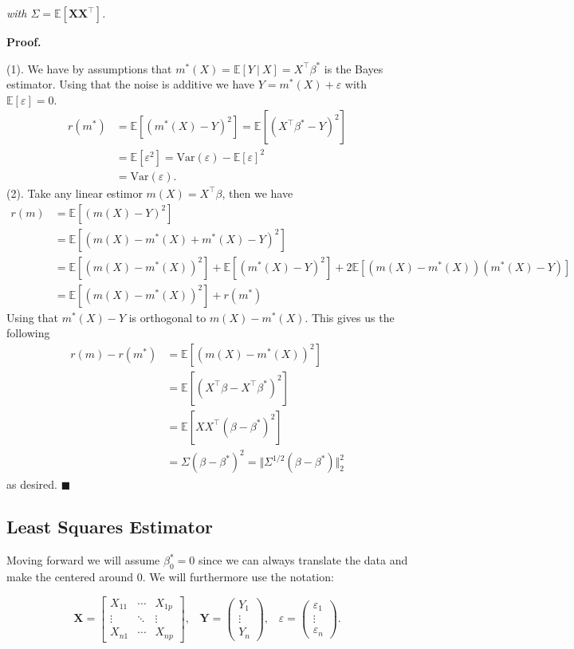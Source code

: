 \documentclass[a4paper,10pt,openany]{book}
\begin{document}
\emph{with \(\Sigma = \mathbb E[\mathbf X\mathbf X^\top]\).}

\textbf{Proof.}

(1). We have by assumptions that \(m^*(X)=\mathbb E[Y\ \vert\ X]=X^\top\beta^*\) is the Bayes estimator. Using that the noise is additive we have \(Y=m^*(X)+\varepsilon\) with \(\mathbb E[\varepsilon]=0\).
\begin{align*}
r(m^*)&=\mathbb E[(m^*(X)-Y)^2]=\mathbb E[(X^\top\beta ^*-Y)^2]\\
&=\mathbb E[\varepsilon^2]=\text{Var}(\varepsilon)-\mathbb E[\varepsilon]^2\\
&=\text{Var}(\varepsilon).
\end{align*}
(2). Take any linear estimor \(m(X)=X^\top \beta\), then we have
\begin{align*}
r(m)&=\mathbb E[(m(X)-Y)^2]\\
&=\mathbb E[(m(X)-m^*(X)+m^*(X)-Y)^2]\\
&=\mathbb E[(m(X)-m^*(X))^2]+\mathbb E[(m^*(X)-Y)^2]+2\mathbb E[(m(X)-m^*(X))(m^*(X)-Y)]\\
&=\mathbb E[(m(X)-m^*(X))^2]+r(m^*)
\end{align*}
Using that \(m^*(X)-Y\) is orthogonal to \(m(X)-m^*(X)\). This gives us the following
\begin{align*}
r(m)- r(m^*)&=\mathbb E[(m(X)-m^*(X))^2]\\
&=\mathbb E[(X^\top \beta -X^\top \beta^*)^2]\\
&=\mathbb E[XX^\top(\beta-\beta^*)^2]\\
&=\Sigma(\beta-\beta^*)^2=\Vert \Sigma^{1/2}(\beta - \beta^*)\Vert ^2_2
\end{align*}
as desired. \(\blacksquare\)

\hypertarget{least-squares-estimator}{%
\subsection{Least Squares Estimator}\label{least-squares-estimator}}

Moving forward we will assume \(\beta_0^*=0\) since we can always translate the data and make the centered around 0. We will furthermore use the notation:

\[
\mathbf{X}=
\begin{bmatrix}
X_{11} & \cdots & X_{1p}\\
\vdots & \ddots & \vdots\\
X_{n1} & \cdots & X_{np}
\end{bmatrix},\hspace{10pt} \mathbf{Y}=
\begin{pmatrix}
Y_1\\
\vdots\\
Y_n
\end{pmatrix},\hspace{10pt} \varepsilon=
\begin{pmatrix}
\varepsilon_1\\
\vdots\\
\varepsilon_n
\end{pmatrix}.
\]
\end{document}
